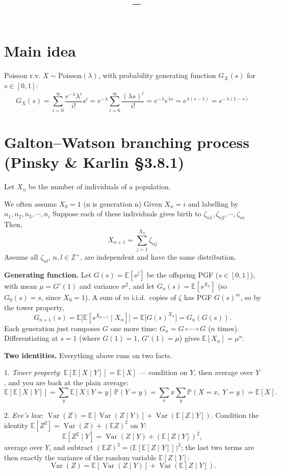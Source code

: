 \documentclass[11pt]{article}
\title{\vspace{-1.5em}\textbf{\coursename\ -- \lecturetitle}}
\author{\studentname}
\date{\lecturedate}
\newcommand{\Z}{\mathbb{Z}}
\newcommand{\E}{\mathbb{E}}
\newcommand{\Prob}{\mathbb{P}}
\newcommand{\1}{\mathbf{1}}
\newcommand{\given}{\;\big\vert\;}
\DeclareMathOperator{\Var}{Var}
\theoremstyle{notestyle}
\theoremstyle{definition}
\begin{document}
\maketitle

\section{Main idea}
Poisson r.v. $X \sim \text{Poisson}(\lambda)$, with probability generating function
$G_X(s)$ for $s \in [0, 1]$:
$$G_X(s) = \sum_{i=0}^{\infty} \frac{e^{-\lambda}\lambda^i}{i!}s^i =
e^{-\lambda}\sum_{i=0}^{\infty} \frac{(\lambda s)^i}{i!} = e^{-\lambda}e^{\lambda s} =
e^{\lambda(s - 1)} = e^{-\lambda(1 - s)}$$
\section{Galton--Watson branching process (Pinsky \& Karlin \S 3.8.1)}
\par Let $X_n$ be the number of individuals of a population.
\par We often assume $X_0 = 1$ (n is generation n)
Given $X_n = i$  and labelling by $n_1, n_2, n_3, \cdots, n_i$
Suppose each of these individuals gives birth to $\zeta_{n1},
\zeta_{n2},\cdots,\zeta_{ni}$
Then,
$$X_{n+1} = \sum_{j=1}^{X_n} \zeta_{nj}$$
Assume all $\zeta_{nl}$, $n, l \in \Z^{+}$, are independent and have the same distribution.
\par \textbf{Generating function.} Let $G(s) = \E[s^{\zeta}]$ be the offspring PGF
($s \in [0,1]$), with mean $\mu = G'(1)$ and variance $\sigma^2$, and let
$G_n(s) = \E[s^{X_n}]$ (so $G_0(s) = s$, since $X_0 = 1$). A sum of $m$ i.i.d.\ copies
of $\zeta$ has PGF $G(s)^m$, so by the tower property,
$$G_{n+1}(s) = \E\big[\E[s^{X_{n+1}} \given X_n]\big]
= \E\big[G(s)^{X_n}\big] = G_n(G(s)).$$
Each generation just composes $G$ one more time: $G_n = G \circ \cdots \circ G$ ($n$
times). Differentiating at $s = 1$ (where $G(1) = 1$, $G'(1) = \mu$) gives
$\E[X_n] = \mu^n$.

\par \textbf{Two identities.} Everything above runs on two facts.
\par 1. \textit{Tower property}: $\E[\E[X \given Y]] = \E[X]$ --- condition on $Y$, then
average over $Y$, and you are back at the plain average:
$$\E[\E[X \given Y]] = \sum_y \E[X \given Y{=}y]\, \Prob(Y{=}y)
= \sum_x x \sum_y \Prob(X{=}x,\ Y{=}y) = \E[X].$$
\par 2. \textit{Eve's law}: $\Var(Z) = \E[\Var(Z \given Y)] + \Var(\E[Z \given Y])$.
Condition the identity $\E[Z^2] = \Var(Z) + (\E Z)^2$ on $Y$:
$$\E[Z^2 \given Y] = \Var(Z \given Y) + (\E[Z \given Y])^2,$$
average over $Y$, and subtract $(\E Z)^2 = \big(\E[\E[Z \given Y]]\big)^2$; the last two
terms are then exactly the variance of the random variable $\E[Z \given Y]$:
$$\Var(Z) = \E[\Var(Z \given Y)] + \Var(\E[Z \given Y]).$$
\end{document}
